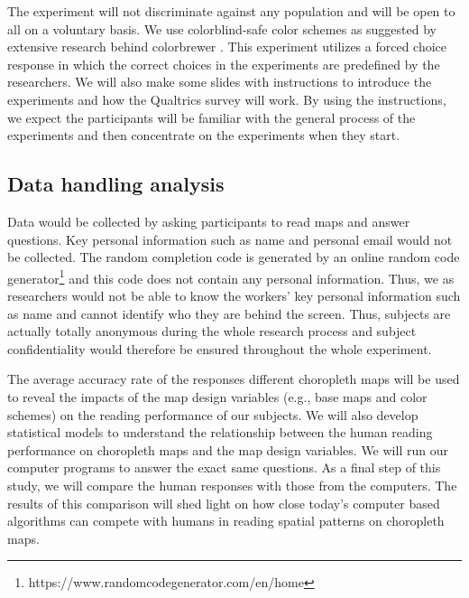 The experiment will not discriminate against any population and will be open to all on a voluntary basis. We use colorblind-safe color schemes as suggested by extensive research behind colorbrewer \citep{harrower2003colorbrewer}. This experiment utilizes a forced choice response in which the correct choices in the experiments are predefined by the researchers. We will also make some slides with instructions to introduce the experiments and how the Qualtrics survey will work. By using the instructions, we expect the participants will be familiar with the general process of the experiments and then concentrate on the experiments when they start. 

\subsection{Data handling analysis}

Data would be collected by asking participants to read maps and answer questions. Key personal information such as name and personal email would not be collected. The random completion code is generated by an online random code generator\footnote{https://www.randomcodegenerator.com/en/home} and this code does not contain any personal information. Thus, we as researchers would not be able to know the workers' key personal information such as name and cannot identify who they are behind the screen. Thus, subjects are actually totally anonymous during the whole research process and subject confidentiality would therefore be ensured throughout the whole experiment.

The average accuracy rate of the responses different choropleth maps will be used to reveal the impacts of the map design variables (e.g., base maps and color schemes) on the reading performance of our subjects. We will also develop statistical models to understand the relationship between the human reading performance on choropleth maps and the map design variables. We will run our computer programs to answer the exact same questions. As a final step of this study, we will compare the human responses with those from the computers. The results of this comparison will shed light on how close today's computer based algorithms can compete with humans in reading spatial patterns on choropleth maps. 






